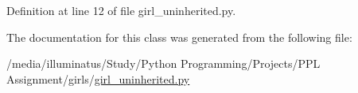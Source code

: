 Definition at line 12 of file girl\+\_\+uninherited.\+py.



The documentation for this class was generated from the following file\+:\begin{DoxyCompactItemize}
\item 
/media/illuminatus/\+Study/\+Python Programming/\+Projects/\+P\+P\+L Assignment/girls/\hyperlink{girl__uninherited_8py}{girl\+\_\+uninherited.\+py}\end{DoxyCompactItemize}

